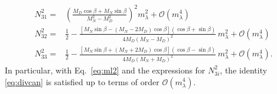 \begin{align}
\label{eq:mixl2}
N_{31}^2=&\left(\frac{M_{D} \cos\beta + M_{N} \sin\beta}{M_{N}^{2}- M_{D}^{2}} \right)^{2}   m_{\lambda}^{2}
+\mathcal{O}\left( m_{\lambda}^4 \right)\nonumber\\
N_{32}^2=&\frac{1}{2}-\frac{\left[M_{N} \sin\beta - \left( M_{N}- 2 M_{D}\right) \cos\beta\right] \left(\cos\beta+\sin\beta \right)}{4 M_{D} \left(M_{N}- M_{D}\right)^{2}}\,m_{\lambda}^{2}+\mathcal{O}\left( m_{\lambda}^4 \right)  \nonumber\\
N_{33}^2=&\frac{1}{2}- \frac{\left[M_{N} \sin\beta + \left(M_{N} + 2 M_{D}\right) \cos\beta\right] \left(\cos\beta- \sin\beta \right)}{4 M_{D} \left(M_{N} + M_{D} \right)^{2}} \,m_{\lambda}^{2}+\mathcal{O}\left( m_{\lambda}^4 \right).
\end{align}
In particular, with Eq.~\eqref{eq:ml2} and the expressions for $N_{3i}^2$, the identity \eqref{eq:divcan}
is satisfied up to terms of order $\mathcal{O}\left( m_{\lambda}^4
\right)$.










